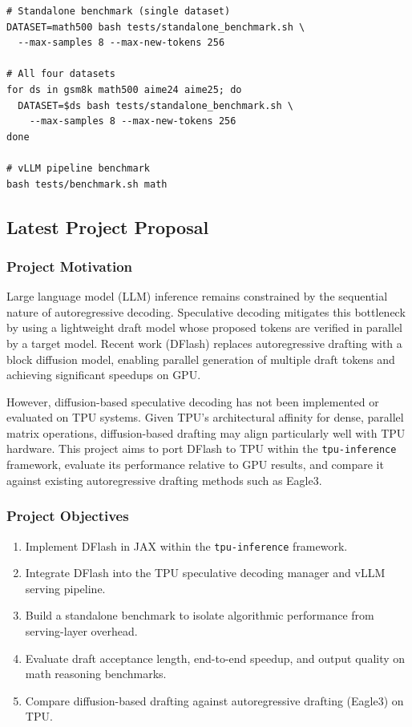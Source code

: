 \documentclass[12pt,letterpaper]{article}
\begin{document}
\begin{verbatim}
# Standalone benchmark (single dataset)
DATASET=math500 bash tests/standalone_benchmark.sh \
  --max-samples 8 --max-new-tokens 256

# All four datasets
for ds in gsm8k math500 aime24 aime25; do
  DATASET=$ds bash tests/standalone_benchmark.sh \
    --max-samples 8 --max-new-tokens 256
done

# vLLM pipeline benchmark
bash tests/benchmark.sh math
\end{verbatim}

\subsection{Latest Project Proposal}

\subsubsection*{Project Motivation}

Large language model (LLM) inference remains constrained by the sequential nature of autoregressive decoding. Speculative decoding mitigates this bottleneck by using a lightweight draft model whose proposed tokens are verified in parallel by a target model. Recent work (DFlash) replaces autoregressive drafting with a block diffusion model, enabling parallel generation of multiple draft tokens and achieving significant speedups on GPU.

However, diffusion-based speculative decoding has not been implemented or evaluated on TPU systems. Given TPU’s architectural affinity for dense, parallel matrix operations, diffusion-based drafting may align particularly well with TPU hardware. This project aims to port DFlash to TPU within the \texttt{tpu-inference} framework, evaluate its performance relative to GPU results, and compare it against existing autoregressive drafting methods such as Eagle3.

\subsubsection*{Project Objectives}

\begin{enumerate}
    \item Implement DFlash in JAX within the \texttt{tpu-inference} framework.
    \item Integrate DFlash into the TPU speculative decoding manager and vLLM serving pipeline.
    \item Build a standalone benchmark to isolate algorithmic performance from serving-layer overhead.
    \item Evaluate draft acceptance length, end-to-end speedup, and output quality on math reasoning benchmarks.
    \item Compare diffusion-based drafting against autoregressive drafting (Eagle3) on TPU.
\end{enumerate}
\end{document}
